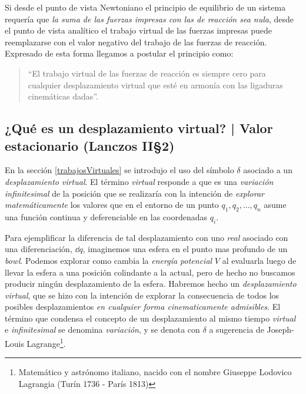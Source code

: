 \documentclass[12pt,spanish,a4paper]{article}
\begin{document}
Si desde el punto de vista Newtoniano el principio de equilibrio de un sistema requería que \emph{la suma de las fuerzas impresas con las de reacción sea nula}, desde el punto de vista analítico el trabajo virtual de las fuerzas impresas puede reemplazarse con el valor negativo del trabajo de las fuerzas de reacción.
Expresado de esta forma llegamos a postular el principio como:
\begin{quote} 
``El trabajo virtual de las fuerzas de reacción es siempre cero para cualquier desplazamiento virtual que esté en armonía con las ligaduras cinemáticas dadas''.
\end{quote} 




\subsection{¿Qué es un desplazamiento virtual? | Valor estacionario {\small (Lanczos II\S2) } }\label{desplazamientoVirtual}
En la sección \ref{trabajosVirtuales} se introdujo el uso del símbolo \(\delta\) asociado a un \emph{desplazamiento virtual}.
El término \emph{virtual} responde a que es una \emph{variación infinitesimal} de la posición que se realizaría con la intención de \emph{explorar matemáticamente} los valores que en el entorno de un punto \(q_1, q_2, \ldots, q_n\) asume una función continua y deferenciable en las coordenadas \(q_i\).

Para ejemplificar la diferencia de tal desplazamiento con uno \emph{real} asociado con una diferenciación, \(\dd q\), imaginemos una esfera en el punto mas profundo de un \emph{bowl}.
Podemos explorar como cambia la \emph{energía potencial} \(V\) al evaluarla luego de llevar la esfera a una posición colindante a la actual, pero de hecho no buscamos producir ningún desplazamiento de la esfera.
Habremos hecho un \emph{desplazamiento virtual}, que se hizo con la intención de explorar la consecuencia de todos los posibles desplazamientos \emph{en cualquier forma cinematicamente admisibles}.
El término que condensa el concepto de un desplazamiento al mismo tiempo \emph{virtual} e \emph{infinitesimal} se denomina \emph{variación}, y se denota con \(\delta\) a sugerencia de Joseph-Louis Lagrange\footnote{Matemático y astrónomo italiano, nacido con el nombre Giuseppe Lodovico Lagrangia (Turín 1736 - París 1813)}.
\end{document}
